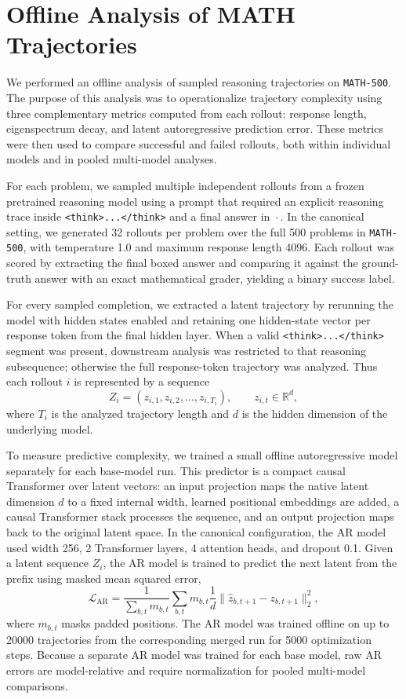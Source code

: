 
\section{Offline Analysis of MATH Trajectories}

We performed an offline analysis of sampled reasoning trajectories on \texttt{MATH-500}. The purpose of this analysis was to operationalize trajectory complexity using three complementary metrics computed from each rollout: response length, eigenspectrum decay, and latent autoregressive prediction error. These metrics were then used to compare successful and failed rollouts, both within individual models and in pooled multi-model analyses.

For each problem, we sampled multiple independent rollouts from a frozen pretrained reasoning model using a prompt that required an explicit reasoning trace inside \texttt{<think>...</think>} and a final answer in \(\boxed{\cdot}\). In the canonical setting, we generated 32 rollouts per problem over the full 500 problems in \texttt{MATH-500}, with temperature 1.0 and maximum response length 4096. Each rollout was scored by extracting the final boxed answer and comparing it against the ground-truth answer with an exact mathematical grader, yielding a binary success label.

For every sampled completion, we extracted a latent trajectory by rerunning the model with hidden states enabled and retaining one hidden-state vector per response token from the final hidden layer. When a valid \texttt{<think>...</think>} segment was present, downstream analysis was restricted to that reasoning subsequence; otherwise the full response-token trajectory was analyzed. Thus each rollout \(i\) is represented by a sequence
\[
Z_i = (z_{i,1}, z_{i,2}, \dots, z_{i,T_i}),
\qquad z_{i,t} \in \mathbb{R}^d,
\]
where \(T_i\) is the analyzed trajectory length and \(d\) is the hidden dimension of the underlying model.

To measure predictive complexity, we trained a small offline autoregressive model separately for each base-model run. This predictor is a compact causal Transformer over latent vectors: an input projection maps the native latent dimension \(d\) to a fixed internal width, learned positional embeddings are added, a causal Transformer stack processes the sequence, and an output projection maps back to the original latent space. In the canonical configuration, the AR model used width 256, 2 Transformer layers, 4 attention heads, and dropout 0.1. Given a latent sequence \(Z_i\), the AR model is trained to predict the next latent from the prefix using masked mean squared error,
\[
\mathcal{L}_{\mathrm{AR}}
=
\frac{1}{\sum_{b,t} m_{b,t}}
\sum_{b,t} m_{b,t}
\frac{1}{d}
\lVert \hat z_{b,t+1} - z_{b,t+1} \rVert_2^2,
\]
where \(m_{b,t}\) masks padded positions. The AR model was trained offline on up to 20000 trajectories from the corresponding merged run for 5000 optimization steps. Because a separate AR model was trained for each base model, raw AR errors are model-relative and require normalization for pooled multi-model comparisons.

